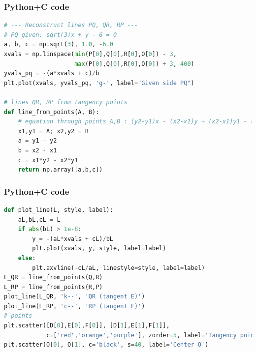 \documentclass{beamer}
\begin{document}
\begin{frame}[fragile]
    \frametitle{Python+C code}
    \begin{lstlisting}[language=Python]
# --- Reconstruct lines PQ, QR, RP ---
# PQ given: sqrt(3)x + y - 6 = 0
a, b, c = np.sqrt(3), 1.0, -6.0
xvals = np.linspace(min(P[0],Q[0],R[0],O[0]) - 3,
                    max(P[0],Q[0],R[0],O[0]) + 3, 400)
yvals_pq = -(a*xvals + c)/b
plt.plot(xvals, yvals_pq, 'g-', label="Given side PQ")

# lines QR, RP from tangency points
def line_from_points(A, B):
    # equation through points A,B : (y2-y1)x - (x2-x1)y + (x2-x1)y1 - (y2-y1)x1 = 0
    x1,y1 = A; x2,y2 = B
    a = y1 - y2
    b = x2 - x1
    c = x1*y2 - x2*y1
    return np.array([a,b,c])


    \end{lstlisting}   
\end{frame}

\begin{frame}[fragile]
    \frametitle{Python+C code}
    \begin{lstlisting}[language=Python]
def plot_line(L, style, label):
    aL,bL,cL = L
    if abs(bL) > 1e-8:
        y = -(aL*xvals + cL)/bL
        plt.plot(xvals, y, style, label=label)
    else:
        plt.axvline(-cL/aL, linestyle=style, label=label)
L_QR = line_from_points(Q,R)
L_RP = line_from_points(R,P)
plot_line(L_QR, 'k--', 'QR (tangent E)')
plot_line(L_RP, 'c--', 'RP (tangent F)')
# points
plt.scatter([D[0],E[0],F[0]], [D[1],E[1],F[1]], 
            c=['red','orange','purple'], zorder=5, label='Tangency points D,E,F')
plt.scatter(O[0], O[1], c='black', s=40, label='Center O')
    \end{lstlisting}   
\end{frame}
\end{document}
